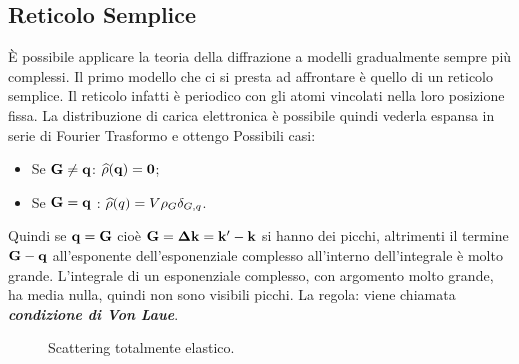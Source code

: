 \documentclass[a4paper,12pt]{article}
\begin{document}
\subsection{Reticolo Semplice}
\`E possibile applicare la teoria della diffrazione a modelli gradualmente sempre più complessi. Il primo modello che ci si presta ad affrontare è quello di un reticolo semplice. Il reticolo infatti è periodico con gli atomi vincolati nella loro posizione fissa. La distribuzione di carica elettronica è possibile quindi vederla espansa in serie di Fourier
Trasformo e ottengo 
Possibili casi:
\begin{itemize}
	\item Se $\it\bf{G} \neq \it\bf{q}$: $\op{\rho} (\vet{q}) =0$;
	\item Se $\it\bf{G} = \it\bf{q}$ : $\op{\rho} (q) = V\rho_{G } \delta_{G ,q}$.
\end{itemize}
Quindi se $\it\bf{q}  = \it\bf{G} $ cioè $\it\bf{G} = \it\bf{\Delta k} = \it\bf{k'} - \it\bf{k}$ si hanno dei picchi, altrimenti il termine ${\it\bf G} - {\it\bf q}$ all'esponente dell'esponenziale complesso all'interno dell'integrale è molto grande. L'integrale di un esponenziale complesso, con argomento molto grande, ha media nulla, quindi non sono visibili picchi. La regola:
viene chiamata \textbf{\textit{condizione di Von Laue}}. 
\begin{figure}
	\centering
	\caption{Scattering totalmente elastico.}
	\label{bragg}
\end{figure}
\end{document}
